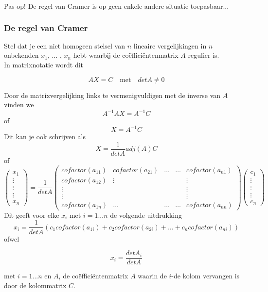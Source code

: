 Pas op! De regel van Cramer is op geen enkele andere situatie toepasbaar...

\subsubsection{De regel van Cramer}

Stel dat je een niet homogeen stelsel van $n$ lineaire vergelijkingen in $n$ onbekenden $x_1$, $...$ , $x_n$ hebt waarbij de co\"{e}ffici\"{e}ntenmatrix $A$ regulier is.\\
In matrixnotatie wordt dit 
\begin{framed}
\[ AX=C \quad \textrm{met} \quad det A \neq 0  \]
\end{framed}
Door de matrixvergelijking links te vermenigvuldigen met de inverse van $A$ vinden we
\[ A^{-1}AX=A^{-1}C \]
of
\[ X=A^{-1}C \]
Dit kan je ook schrijven als
\[ X=\frac{1}{det A}adj(A) C \]
of
\[
\left( \begin{matrix} x_1 \\ \vdots \\ \vdots \\ \vdots \\ x_n \end{matrix} \right) = \frac{1}{det A} \left( \begin{matrix} cofactor(a_{11}) & cofactor(a_{21}) & \ldots & \ldots & cofactor(a_{n1}) \\ cofactor(a_{12}) & \vdots & & & \vdots \\ \vdots & & & & \vdots \\ \vdots & & & & \vdots \\ cofactor(a_{1n}) & \ldots & \ldots & \ldots & cofactor(a_{nn}) \end{matrix} \right) \left( \begin{matrix} c_1 \\ \vdots \\ \vdots \\ \vdots \\ c_n \end{matrix} \right)
\]
Dit geeft voor elke $x_i$ met $i=1...n$ de volgende uitdrukking
\[
x_i = \frac{1}{det A} (c_1 cofactor(a_{1i}) + c_2 cofactor(a_{2i}) + ... + c_n cofactor(a_{ni})) 
\]
ofwel
\begin{framed}
\[
x_i = \frac{det A_{i}}{det A}
\]
\end{framed}
met $i=1...n$ en $A_{i}$ de co\"{e}ffici\"{e}ntenmatrix $A$ waarin de $i$-de kolom vervangen is door de kolommatrix $C$. \\

